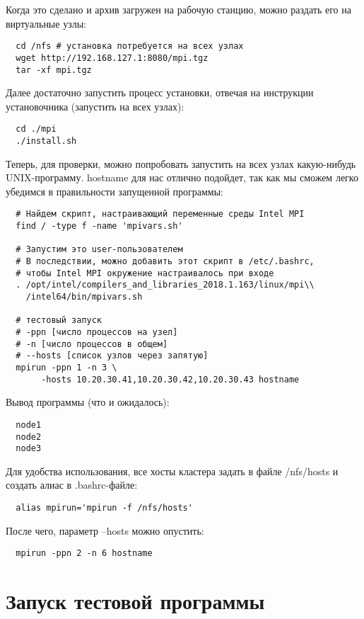 Когда это сделано и архив загружен на рабочую станцию,
можно раздать его на виртуальные узлы:
\begin{verbatim}
  cd /nfs # установка потребуется на всех узлах
  wget http://192.168.127.1:8080/mpi.tgz
  tar -xf mpi.tgz 
\end{verbatim}

  Далее достаточно запустить процесс установки, отвечая 
на инструкции установочника (запустить на всех узлах):
\begin{verbatim}
  cd ./mpi
  ./install.sh 
\end{verbatim}

Теперь, для проверки, можно попробовать запустить на всех узлах 
какую-нибудь UNIX-программу. \textmd{hostname} для нас отлично
подойдет, так как мы  сможем легко убедимся в правильности 
запущенной программы:
\begin{verbatim}
  # Найдем скрипт, настраивающий переменные среды Intel MPI
  find / -type f -name 'mpivars.sh'
  
  # Запустим это user-пользователем
  # В последствии, можно добавить этот скрипт в /etc/.bashrc,
  # чтобы Intel MPI окружение настраивалось при входе
  . /opt/intel/compilers_and_libraries_2018.1.163/linux/mpi\\
    /intel64/bin/mpivars.sh
  
  # тестовый запуск
  # -ppn [число процессов на узел]
  # -n [число процессов в общем]
  # --hosts [список узлов через запятую]
  mpirun -ppn 1 -n 3 \
       -hosts 10.20.30.41,10.20.30.42,10.20.30.43 hostname
\end{verbatim}

Вывод программы (что и ожидалось):
\begin{verbatim}
  node1
  node2
  node3
\end{verbatim}

Для удобства использования, все хосты кластера задать в файле
\textmd{/nfs/hosts} и создать алиас в \textmd{.bashrc}-файле:
\begin{verbatim}
  alias mpirun='mpirun -f /nfs/hosts'
\end{verbatim}
После чего, параметр \textmd{--hosts} можно опустить: 
\begin{verbatim}
  mpirun -ppn 2 -n 6 hostname  
\end{verbatim}
\clearpage

\section{Запуск тестовой программы}

